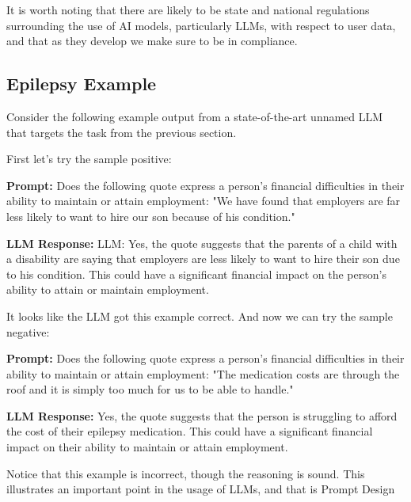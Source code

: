It is worth noting that there are likely to be state and national regulations surrounding the use of AI models, particularly LLMs, with respect to user data, and
that as they develop we make sure to be in compliance.

\subsection{Epilepsy Example}

Consider the following example output from a state-of-the-art unnamed LLM that targets the task from the previous section.

First let's try the sample positive:

\begin{displayquote}
  \textbf{Prompt:} Does the following quote express a person's financial difficulties in their ability to maintain or attain employment: "We have found that employers are far less likely to want to hire our son because of his condition."
\end{displayquote}

\begin{displayquote}
  \textbf{LLM Response:} LLM: Yes, the quote suggests that the parents of a child with a disability are saying that employers are less likely to want to hire their son due to his condition. This could have a significant financial impact on the person's ability to attain or maintain employment.
\end{displayquote}

It looks like the LLM got this example correct. And now we can try the sample negative:

\begin{displayquote}
  \textbf{Prompt:} Does the following quote express a person's financial difficulties in their ability to maintain or attain employment: "The medication costs are through the roof and it is simply too much for us to be able to handle."
\end{displayquote}

\begin{displayquote}
  \textbf{LLM Response:} Yes, the quote suggests that the person is struggling to afford the cost of their epilepsy medication. This could have a significant financial impact on their ability to maintain or attain employment.
\end{displayquote}

Notice that this example is incorrect, though the reasoning is sound. This illustrates an important point in the usage of LLMs, and that is Prompt Design

